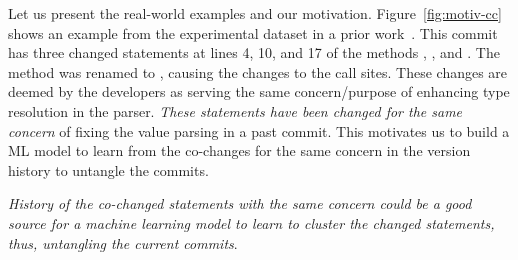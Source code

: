 
Let us present the real-world examples and our
motivation. Figure~\ref{fig:motiv-cc} shows an example from the
experimental dataset in a prior work~\cite{flexeme-fse20}. This commit
has three changed statements at lines 4, 10, and 17 of the methods
, , and .  The
method  was renamed to
, causing the changes to the call sites.
These changes are deemed by the developers as serving the same
concern/purpose of enhancing type resolution in the parser. {\em These
  statements have been changed for the same concern} of fixing the
value parsing in a past commit. This motivates us to build a ML model
to learn from the co-changes for the same concern in the version
history to untangle the commits.


 {\em
  History of the co-changed statements with the same concern could be
  a good source for a machine learning model to learn to cluster the
  changed statements, thus, untangling the current commits}.

